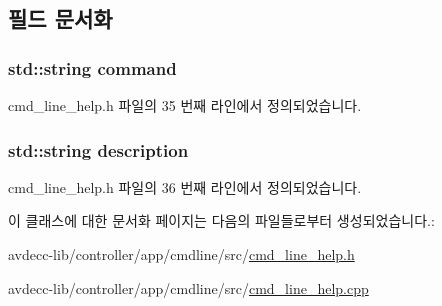 \subsection{필드 문서화}
\subsubsection[{\texorpdfstring{command}{command}}]{\setlength{\rightskip}{0pt plus 5cm}std\+::string command\hspace{0.3cm}{\ttfamily [private]}}\hypertarget{classcmd__line__help_ae59b6e754570ebc0c6d2edd75c3ea894}{}\label{classcmd__line__help_ae59b6e754570ebc0c6d2edd75c3ea894}


cmd\+\_\+line\+\_\+help.\+h 파일의 35 번째 라인에서 정의되었습니다.

\subsubsection[{\texorpdfstring{description}{description}}]{\setlength{\rightskip}{0pt plus 5cm}std\+::string description\hspace{0.3cm}{\ttfamily [private]}}\hypertarget{classcmd__line__help_a2e1454f6988673f814408646edaeb320}{}\label{classcmd__line__help_a2e1454f6988673f814408646edaeb320}


cmd\+\_\+line\+\_\+help.\+h 파일의 36 번째 라인에서 정의되었습니다.



이 클래스에 대한 문서화 페이지는 다음의 파일들로부터 생성되었습니다.\+:\begin{DoxyCompactItemize}
\item 
avdecc-\/lib/controller/app/cmdline/src/\hyperlink{cmd__line__help_8h}{cmd\+\_\+line\+\_\+help.\+h}\item 
avdecc-\/lib/controller/app/cmdline/src/\hyperlink{cmd__line__help_8cpp}{cmd\+\_\+line\+\_\+help.\+cpp}\end{DoxyCompactItemize}
